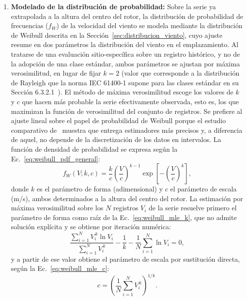 \begin{enumerate}
    \item \textbf{Modelado de la distribución de probabilidad:} Sobre la serie ya extrapolada a la altura del centro del rotor, la distribución de probabilidad de frecuencias ($f_W$) de la velocidad del viento se modela mediante la distribución de Weibull descrita en la Sección~\ref{sec:distribucion_viento}, cuyo ajuste resume en dos parámetros la distribución del viento en el emplazamiento. Al tratarse de una evaluación sitio-específica sobre un registro histórico, y no de la adopción de una clase estándar, ambos parámetros se ajustan por máxima verosimilitud, en lugar de fijar $k = 2$ (valor que corresponde a la distribución de Rayleigh que la norma IEC 61400-1 supone para las clases estándar en su Sección 6.3.2.1~\parencite*{IEC61400-1}). El método de máxima verosimilitud escoge los valores de $k$ y $c$ que hacen más probable la serie efectivamente observada, esto es, los que maximizan la función de verosimilitud del conjunto de registros. Se prefiere al ajuste lineal sobre el papel de probabilidad de Weibull porque el estudio comparativo de~\textcite{Seguro2000} muestra que entrega estimadores más precisos y, a diferencia de aquel, no depende de la discretización de los datos en intervalos. La función de densidad de probabilidad se expresa según la Ec.~\ref{eq:weibull_pdf_general}:
    \begin{equation}
        f_W(V; k, c) = \frac{k}{c} \left( \frac{V}{c} \right)^{k-1} \exp\left[ -\left( \frac{V}{c} \right)^k \right],
    \label{eq:weibull_pdf_general}
    \end{equation}
    donde $k$ es el parámetro de forma (adimensional) y $c$ el parámetro de escala (m/s), ambos determinados a la altura del centro del rotor. La estimación por máxima verosimilitud sobre los $N$ registros $V_i$ de la serie resuelve primero el parámetro de forma como raíz de la Ec.~\ref{eq:weibull_mle_k}, que no admite solución explícita y se obtiene por iteración numérica:
    \begin{equation}
        \frac{\sum_{i=1}^{N} V_i^{\,k} \ln V_i}{\sum_{i=1}^{N} V_i^{\,k}} - \frac{1}{k} - \frac{1}{N} \sum_{i=1}^{N} \ln V_i = 0,
        \label{eq:weibull_mle_k}
    \end{equation}
    y a partir de ese valor obtiene el parámetro de escala por sustitución directa, según la Ec.~\ref{eq:weibull_mle_c}:
    \begin{equation}
        c = \left( \frac{1}{N} \sum_{i=1}^{N} V_i^{\,k} \right)^{1/k}.
        \label{eq:weibull_mle_c}
    \end{equation}
\end{enumerate}

